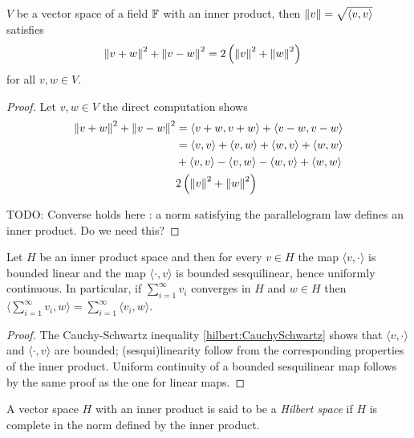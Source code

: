 \begin{prop}\label{hilbert:ParallelogramLaw} $V$ be a vector space of
  a field $\mathbb{F}$ with an inner product, then $\left \lVert v \right \rVert =
  \sqrt{\langle v, v \rangle}$ satisfies
  \begin{align*}
    \left \lVert v + w \right \rVert^2 + \left \lVert v - w \right \rVert^2 &= 2\left(\left \lVert v \right \rVert^2 + \left \lVert w \right \rVert^2\right)
  \end{align*}
  for all $v, w \in V$.
\end{prop}
\begin{proof}
  Let $v,w \in V$ the direct computation shows
  \begin{align*}
     \left \lVert v + w \right \rVert^2 + \left \lVert v - w \right \rVert^2 &= \langle v+w, v+w \rangle +
                                       \langle v-w, v-w \rangle \\
    &= \langle v, v \rangle + \langle v, w \rangle + \langle w,v
      \rangle + \langle w, w \rangle \\
    &+\langle v, v \rangle - \langle v, w \rangle - \langle w,v
      \rangle + \langle w, w \rangle \\
    & 2 \left(\left \lVert v \right \rVert^2  + \left \lVert w \right \rVert^2 \right)
  \end{align*}

  TODO: Converse holds here : a norm satisfying the parallelogram law
  defines an inner product.   Do we need this?
\end{proof}

\begin{prop}\label{hilbert:ContinuityOfInnerProduct}Let $H$ be an inner product space and then for every $v \in H$ the map $\langle v, \cdot \rangle$ is bounded linear and the map $\langle \cdot, v \rangle$ is bounded sesquilinear, hence uniformly continuous.  In particular, if $\sum_{i=1}^\infty v_i$ converges in $H$ and $w \in H$ then $\langle \sum_{i=1}^\infty v_i, w \rangle=\sum_{i=1}^\infty \langle v_i, w \rangle$.
\end{prop}
\begin{proof}
The Cauchy-Schwartz inequality \ref{hilbert:CauchySchwartz} shows that $\langle v, \cdot \rangle$ and $\langle \cdot, v \rangle$ are bounded; (sesqui)linearity follow from the corresponding properties of the inner product.  Uniform continuity of a bounded sesquilinear map follows by the same proof as the one for linear maps.
\end{proof}

\begin{defn}A vector space $H$ with an inner product is said to be a
  \emph{Hilbert space} if $H$ is complete in the norm defined by the
  inner product.
\end{defn}

